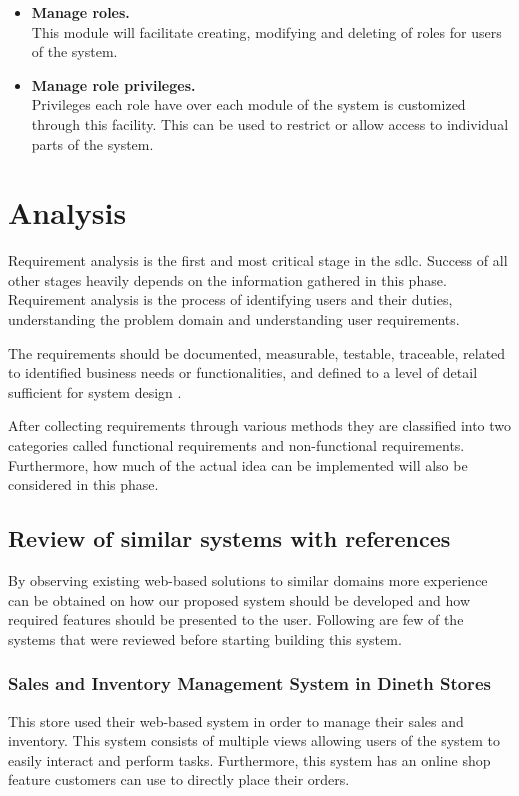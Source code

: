 \documentclass[12pt]{report}
\begin{document}
\begin{itemize}
	\item {\bf{Manage roles.}}\\
	      This module will facilitate creating, modifying and deleting of roles for users of the system.

	\item {\bf{Manage role privileges.}}\\
	      Privileges each role have over each module of the system is customized through this facility. This can be used to restrict or allow access to individual parts of the system.
\end{itemize}

\newpage
\chapter{Analysis}

Requirement analysis is the first and most critical stage in the \acrlong{sdlc}. Success of all other stages heavily depends on the information gathered in this phase. Requirement analysis is the process of identifying users and their duties, understanding the problem domain and understanding user requirements.

The requirements should be documented, measurable, testable, traceable, related to identified business needs or functionalities, and defined to a level of detail sufficient for system design \cite{sommerville_2008_se}.

After collecting requirements through various methods they are classified into two categories called functional requirements and non-functional requirements. Furthermore, how much of the actual idea can be implemented will also be considered in this phase.

\section{Review of similar systems with references}
By observing existing web-based solutions to similar domains  more experience can be obtained on how our proposed system should be developed and how required features should be presented to the user.  Following are few of the systems that were reviewed before starting building this system.

\subsection{Sales and Inventory Management System in Dineth Stores}
This store used their web-based system in order to manage their sales and inventory. This system consists of multiple views allowing users of the system to easily interact and perform tasks.  Furthermore, this system has an online shop feature customers can use to directly place their orders.
\end{document}
